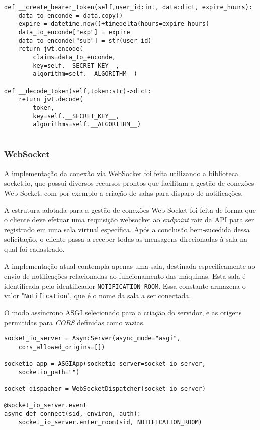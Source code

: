 \begin{verbatim}
def __create_bearer_token(self,user_id:int, data:dict, expire_hours):
    data_to_enconde = data.copy()
    expire = datetime.now()+timedelta(hours=expire_hours)
    data_to_enconde["exp"] = expire
    data_to_enconde["sub"] = str(user_id)
    return jwt.encode(
        claims=data_to_enconde,
        key=self.__SECRET_KEY__,
        algorithm=self.__ALGORITHM__)

def __decode_token(self,token:str)->dict:
    return jwt.decode(
        token,
        key=self.__SECRET_KEY__,
        algorithms=self.__ALGORITHM__)
    
\end{verbatim}

\subsubsection{WebSocket}\label{subsubsec:WebSocketImplement}
A implementação da conexão via WebSocket foi feita utilizando a biblioteca socket.io, que possui diversos recursos prontos que facilitam a gestão de conexões Web Socket, com por exemplo a criação de salas para disparo de notificações.

A estrutura adotada para a gestão de conexões Web Socket foi feita de forma que o cliente deve efetuar uma requisição websocket ao \textit{endpoint} raiz da \gls{API} para ser registrado em uma sala virtual específica. Após a conclusão bem-sucedida dessa solicitação, o cliente passa a receber todas as mensagens direcionadas à sala na qual foi cadastrado.

A implementação atual contempla apenas uma sala, destinada especificamente ao envio de notificações relacionadas ao funcionamento das máquinas. Esta sala é identificada pelo identificador \texttt{NOTIFICATION\_ROOM}. Essa constante armazena o valor "\texttt{Notification}", que é o nome da sala a ser conectada.

O modo assíncrono \gls{ASGI} selecionado para a criação do servidor, e as origens permitidas para \textit{CORS} definidas como vazias.

\begin{verbatim}
socket_io_server = AsyncServer(async_mode="asgi",
    cors_allowed_origins=[])

socketio_app = ASGIApp(socketio_server=socket_io_server,
    socketio_path="")

socket_dispacher = WebSocketDispatcher(socket_io_server)

@socket_io_server.event
async def connect(sid, environ, auth):
    socket_io_server.enter_room(sid, NOTIFICATION_ROOM)
\end{verbatim}

